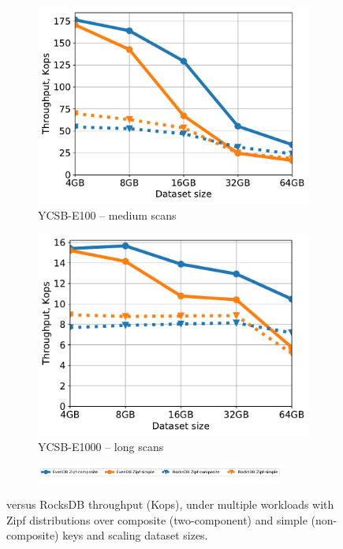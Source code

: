 \begin{figure}[tb]
\begin{subfigure}{0.33\linewidth}
\includegraphics[width=\textwidth]{figs/Workload_E_line.pdf}
\caption{YCSB-E100 -- medium scans}
\label{fig:throughput:e100}
\end{subfigure}
\begin{subfigure}{0.33\linewidth}
\includegraphics[width=\textwidth]{figs/Workload_E+_line.pdf}
\caption{YCSB-E1000 -- long scans}
\label{fig:throughput:e1000}
\end{subfigure}
\begin{subfigure}{\linewidth}
\centerline{
\includegraphics[width=0.9\textwidth]{figs/legend.pdf}
\vspace{-5mm}
}
\end{subfigure}
\caption{
{\sys\/ versus RocksDB throughput (Kops), under multiple workloads with Zipf distributions over composite (two-component) and
simple (non-composite) keys and scaling dataset sizes.}
}
\label{fig:throughput}
\end{figure}

